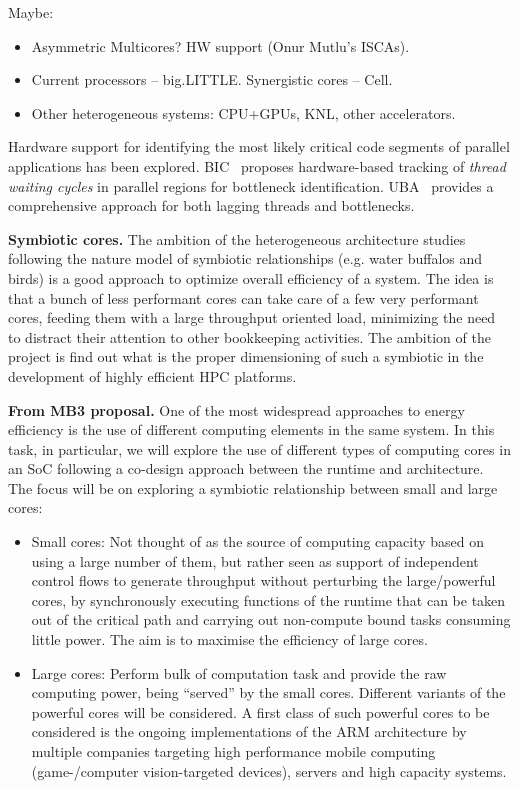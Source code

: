 Maybe:
\begin{itemize}
 \item Asymmetric Multicores? HW support (Onur Mutlu's ISCAs).
 \item Current processors -- big.LITTLE. Synergistic cores -- Cell.
 \item Other heterogeneous systems: CPU+GPUs, KNL, other accelerators.
\end{itemize}

Hardware support for identifying the most likely critical code segments of parallel applications has been explored. BIC~\cite{Joao:ASPLOS2012} proposes hardware-based tracking of \emph{thread waiting cycles} in parallel regions for bottleneck identification. 
UBA~\cite{Joao:ISCA2013} provides a comprehensive approach for both lagging threads and bottlenecks.


\textbf{Symbiotic cores.}
The ambition of the heterogeneous architecture studies following the nature model of symbiotic relationships
(e.g. water buffalos and birds) is a good approach to optimize overall efficiency of a system. The idea is that
a bunch of less performant cores can take care of a few very performant cores, feeding them with a large
throughput oriented load, minimizing the need to distract their attention to other bookkeeping activities. The
ambition of the project is find out what is the proper dimensioning of such a symbiotic in the development of
highly efficient HPC platforms.

\textbf{From MB3 proposal.}
One of the most widespread approaches to energy efficiency is the use of different computing elements in the
same system. In this task, in particular, we will explore the use of different types of computing cores in an
SoC following a co-design approach between the runtime and architecture. The focus will be on exploring a
symbiotic relationship between small and large cores:

\begin{itemize}
 \item Small cores: Not thought of as the source of computing capacity based on using a large number of
them, but rather seen as support of independent control flows to generate throughput without
perturbing the large/powerful cores, by synchronously executing functions of the runtime that can be
taken out of the critical path and carrying out non-compute bound tasks consuming little power. The
aim is to maximise the efficiency of large cores.

  \item Large cores: Perform bulk of computation task and provide the raw computing power, being
“served” by the small cores. Different variants of the powerful cores will be considered. A first class
of such powerful cores to be considered is the ongoing implementations of the ARM architecture by
multiple companies targeting high performance mobile computing (game-/computer vision-targeted
devices), servers and high capacity systems.

\end{itemize}

